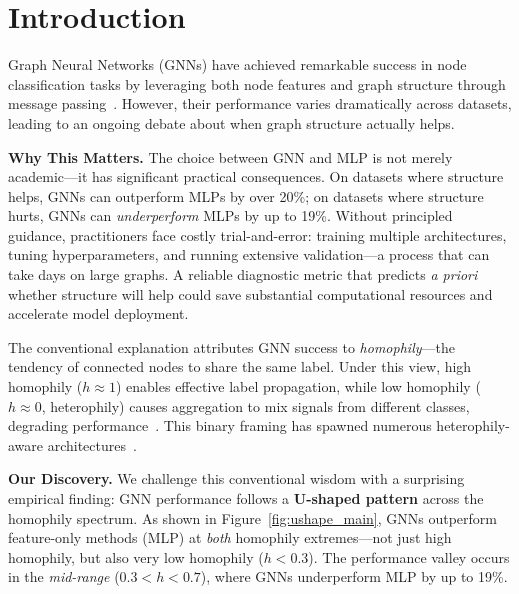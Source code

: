 
\section{Introduction}
\label{sec:intro}

Graph Neural Networks (GNNs) have achieved remarkable success in node classification tasks by leveraging both node features and graph structure through message passing~\cite{kipf2017gcn,velivckovic2018gat,hamilton2017graphsage}. However, their performance varies dramatically across datasets, leading to an ongoing debate about when graph structure actually helps.

\textbf{Why This Matters.} The choice between GNN and MLP is not merely academic---it has significant practical consequences. On datasets where structure helps, GNNs can outperform MLPs by over 20\%; on datasets where structure hurts, GNNs can \textit{underperform} MLPs by up to 19\%. Without principled guidance, practitioners face costly trial-and-error: training multiple architectures, tuning hyperparameters, and running extensive validation---a process that can take days on large graphs. A reliable diagnostic metric that predicts \textit{a priori} whether structure will help could save substantial computational resources and accelerate model deployment.

The conventional explanation attributes GNN success to \textit{homophily}---the tendency of connected nodes to share the same label. Under this view, high homophily ($h \approx 1$) enables effective label propagation, while low homophily ($h \approx 0$, heterophily) causes aggregation to mix signals from different classes, degrading performance~\cite{zhu2020beyond}. This binary framing has spawned numerous heterophily-aware architectures~\cite{bo2021fagcn}.

\textbf{Our Discovery.} We challenge this conventional wisdom with a surprising empirical finding: GNN performance follows a \textbf{U-shaped pattern} across the homophily spectrum. As shown in Figure~\ref{fig:ushape_main}, GNNs outperform feature-only methods (MLP) at \textit{both} homophily extremes---not just high homophily, but also very low homophily ($h < 0.3$). The performance valley occurs in the \textit{mid-range} ($0.3 < h < 0.7$), where GNNs underperform MLP by up to 19\%.

